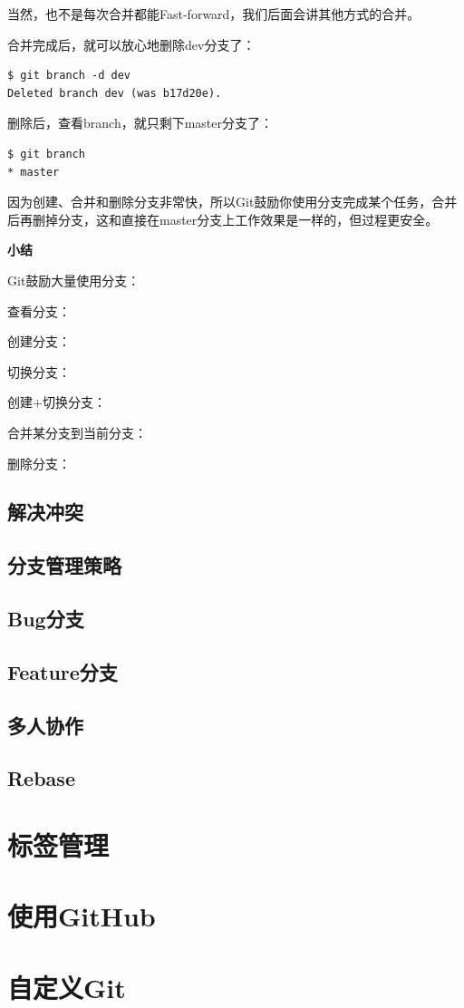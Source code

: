 \documentclass[•]{article}
\begin{document}
\begin{CJK}{UTF8}{gbsn}
当然，也不是每次合并都能Fast-forward，我们后面会讲其他方式的合并。

合并完成后，就可以放心地删除dev分支了：
\begin{lstlisting}
$ git branch -d dev
Deleted branch dev (was b17d20e).
\end{lstlisting}
删除后，查看branch，就只剩下master分支了：
\begin{lstlisting}
$ git branch
* master
\end{lstlisting}
因为创建、合并和删除分支非常快，所以Git鼓励你使用分支完成某个任务，合并后再删掉分支，这和直接在master分支上工作效果是一样的，但过程更安全。

\textbf{小结}

Git鼓励大量使用分支：

查看分支：

创建分支：

切换分支：

创建+切换分支：

合并某分支到当前分支：

删除分支：

\subsection{解决冲突}
\subsection{分支管理策略}
\subsection{Bug分支}
\subsection{Feature分支}
\subsection{多人协作}
\subsection{Rebase}
\section{标签管理}
\section{使用GitHub}
\section{自定义Git}
\end{CJK}
\end{document}
